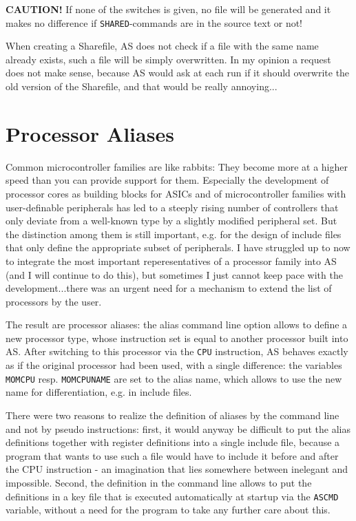 \documentclass[12pt,twoside]{report}
\newcommand{\bb}[1]{{\bf #1}}
\newcommand{\tty}[1]{{\tt #1}}
\begin{document}
\bb{CAUTION!} If none of the switches is given, no file will be
generated and it makes no difference if \tty{SHARED}-commands are in the
source text or not!

When creating a Sharefile, AS does not check if a file with the
same name already exists, such a file  will be simply overwritten.
In my opinion a request does not make sense, because AS would
ask at each run if it should overwrite the old version of the
Sharefile, and that would be really annoying...


\section{Processor Aliases}
\label{SectAlias}

Common microcontroller families are like rabbits: They become more at
a higher speed than you can provide support for them.  Especially the
development of processor cores as building blocks for ASICs and of
microcontroller families with user-definable peripherals has led to a
steeply rising number of controllers that only deviate from a
well-known type by a slightly modified peripheral set.  But the
distinction among them is still important, e.g. for the design of
include files that only define the appropriate subset of peripherals.
I have struggled up to now to integrate the most important
reperesentatives of a processor family into AS (and I will continue
to do this), but sometimes I just cannot keep pace with the
development...there was an urgent need for a mechanism to extend the
list of processors by the user.

The result are processor aliases: the alias command line option allows to
define a new processor type, whose instruction set is equal to another
processor built into AS.  After switching to this processor via the
\tty{CPU} instruction, AS behaves exactly as if the original processor had
been used, with a single difference: the variables \tty{MOMCPU} resp.
\tty{MOMCPUNAME} are set to the alias name, which allows to use the new
name for differentiation, e.g. in include files.

There were two reasons to realize the definition of aliases by the
command line and not by pseudo instructions: first, it would anyway be
difficult to put the alias definitions together with register definitions
into a single include file, because a program that wants to use such a
file would have to include it before and after the CPU instruction - an
imagination that lies somewhere between inelegant and impossible.  Second,
the definition in the command line allows to put the definitions in a key
file that is executed automatically at startup via the \tty{ASCMD}
variable, without a need for the program to take any further care about
this.
\end{document}
